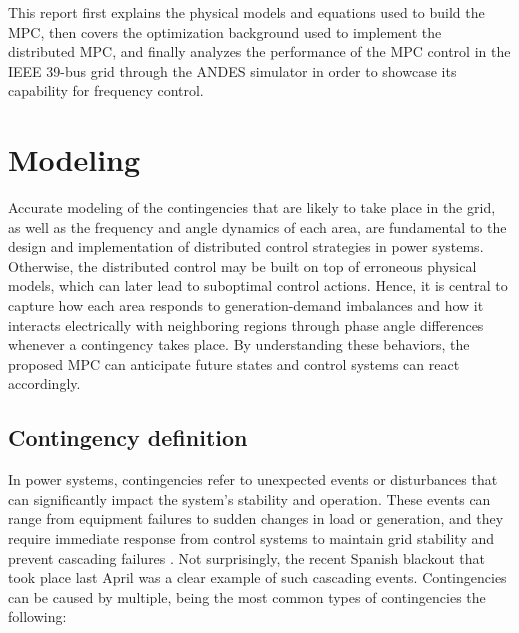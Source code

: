 \documentclass{article}
\begin{document}
This report first explains the physical models and equations used to build the MPC, then covers the optimization background used to implement the distributed MPC, and finally analyzes the performance of the MPC control in the IEEE 39-bus grid through the ANDES simulator in order to showcase its capability for frequency control.

\newpage
\section{Modeling}
Accurate modeling of the contingencies that are likely to take place in the grid, as well as the frequency and angle dynamics of each area, are fundamental to the design and implementation of distributed control strategies in power systems. Otherwise, the distributed control may be built on top of erroneous physical models, which can later lead to suboptimal control actions. Hence, it is central to capture how each area responds to generation-demand imbalances and how it interacts electrically with neighboring regions through phase angle differences whenever a contingency takes place. By understanding these behaviors, the proposed MPC can anticipate future states and control systems can react accordingly.

\subsection{Contingency definition}
In power systems, contingencies refer to unexpected events or disturbances that can significantly impact the system's stability and operation. These events can range from equipment failures to sudden changes in load or generation, and they require immediate response from control systems to maintain grid stability and prevent cascading failures \cite{contingency:analysis}. Not surprisingly, the recent Spanish blackout that took place last April was a clear example of such cascading events. Contingencies can be caused by multiple, being the most common types of contingencies the following:
\end{document}
